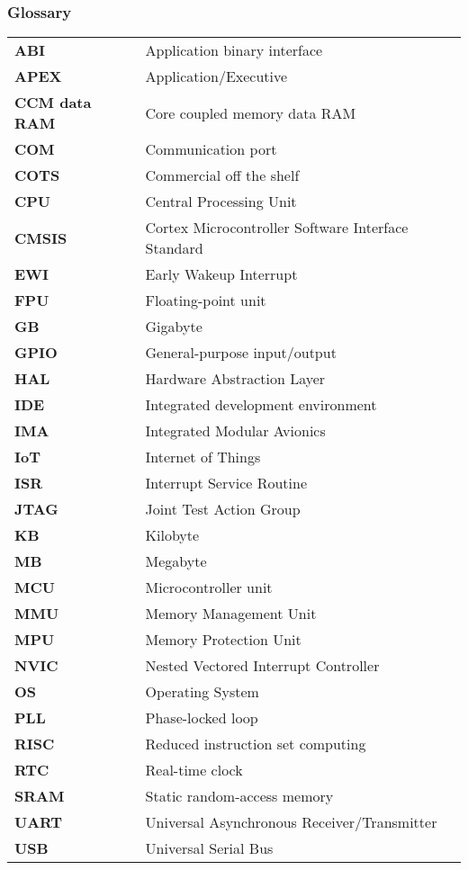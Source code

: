 \subsubsection*{Glossary}
\begin{longtable}{l p{12cm}}
\textbf{ABI}		& \qquad \qquad Application binary interface\\
\textbf{APEX}		& \qquad \qquad Application/Executive\\
\textbf{CCM data RAM}	& \qquad \qquad Core coupled memory data RAM\\
\textbf{COM}		& \qquad \qquad Communication port\\
\textbf{COTS}		& \qquad \qquad Commercial off the shelf\\
\textbf{CPU}		& \qquad \qquad Central Processing Unit\\
\textbf{CMSIS}		& \qquad \qquad Cortex Microcontroller Software Interface Standard\\
\textbf{EWI}		& \qquad \qquad Early Wakeup Interrupt\\
\textbf{FPU}		& \qquad \qquad Floating-point unit\\
\textbf{GB}			& \qquad \qquad Gigabyte\\
\textbf{GPIO}		& \qquad \qquad General-purpose input/output\\
\textbf{HAL}		& \qquad \qquad Hardware Abstraction Layer\\
\textbf{IDE}		& \qquad \qquad Integrated development environment\\
\textbf{IMA}		& \qquad \qquad Integrated Modular Avionics\\
\textbf{IoT}		& \qquad \qquad Internet of Things\\
\textbf{ISR}		& \qquad \qquad Interrupt Service Routine\\
\textbf{JTAG}		& \qquad \qquad Joint Test Action Group\\
\textbf{KB}			& \qquad \qquad Kilobyte\\
\textbf{MB}			& \qquad \qquad Megabyte\\
\textbf{MCU}		& \qquad \qquad Microcontroller unit\\
\textbf{MMU}		& \qquad \qquad Memory Management Unit\\
\textbf{MPU}		& \qquad \qquad Memory Protection Unit\\
\textbf{NVIC}		& \qquad \qquad Nested Vectored Interrupt Controller\\
\textbf{OS}			& \qquad \qquad Operating System\\
\textbf{PLL}		& \qquad \qquad Phase-locked loop\\
\textbf{RISC}		& \qquad \qquad Reduced instruction set computing\\
\textbf{RTC}		& \qquad \qquad Real-time clock\\
\textbf{SRAM}		& \qquad \qquad Static random-access memory\\
\textbf{UART}		& \qquad \qquad Universal Asynchronous Receiver/Transmitter\\
\textbf{USB}		& \qquad \qquad Universal Serial Bus\\

\end{longtable}
